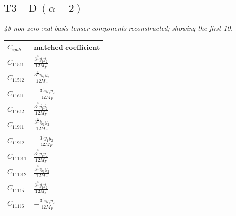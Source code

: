 \documentclass[9pt]{article}
\begin{document}
\subsection*{$ \mathrm{T3-D}\;(\alpha=2) $}
\textit{48 non-zero real-basis tensor components reconstructed; showing the first 10.}
\begin{longtable}{@{}ll@{}}
\toprule
$C_{ijab}$ & matched coefficient \\
\midrule
$C_{11511}$ & $ \frac{3^{\frac{3}{4}} \overline{y_{1}} \overline{y_{2}}}{12 M_F} $ \\
$C_{11512}$ & $ \frac{3^{\frac{3}{4}} i \overline{y_{1}} \overline{y_{2}}}{12 M_F} $ \\
$C_{11611}$ & $ - \frac{3^{\frac{3}{4}} i \overline{y_{1}} \overline{y_{2}}}{12 M_F} $ \\
$C_{11612}$ & $ \frac{3^{\frac{3}{4}} \overline{y_{1}} \overline{y_{2}}}{12 M_F} $ \\
$C_{11911}$ & $ \frac{3^{\frac{3}{4}} i \overline{y_{1}} \overline{y_{2}}}{12 M_F} $ \\
$C_{11912}$ & $ - \frac{3^{\frac{3}{4}} \overline{y_{1}} \overline{y_{2}}}{12 M_F} $ \\
$C_{111011}$ & $ \frac{3^{\frac{3}{4}} \overline{y_{1}} \overline{y_{2}}}{12 M_F} $ \\
$C_{111012}$ & $ \frac{3^{\frac{3}{4}} i \overline{y_{1}} \overline{y_{2}}}{12 M_F} $ \\
$C_{11115}$ & $ \frac{3^{\frac{3}{4}} \overline{y_{1}} \overline{y_{2}}}{12 M_F} $ \\
$C_{11116}$ & $ - \frac{3^{\frac{3}{4}} i \overline{y_{1}} \overline{y_{2}}}{12 M_F} $ \\
\bottomrule
\end{longtable}
\end{document}
